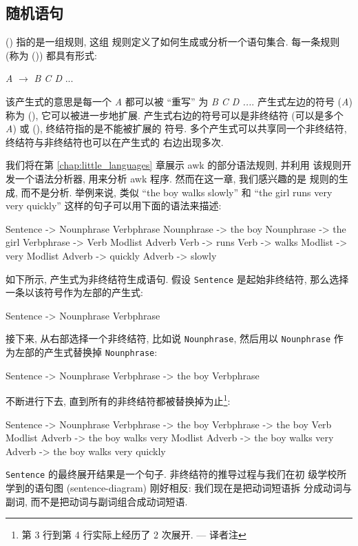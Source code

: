 \subsection{随机语句}
\label{subsec:random_sentences}

 () 指的是一组规则, 这组
规则定义了如何生成或分析一个语句集合. 每一条规则 (称为 
()) 都具有形式:
\begin{pattern}
    \indent\indent\textit{A} $\longrightarrow$ \textit{B C D} ...
\end{pattern}
该产生式的意思是每一个 \textit{A} 都可以被 ``重写'' 为 \textit{B C D ...}.
产生式左边的符号 (\textit{A}) 称为  (),
它可以被进一步地扩展. 产生式右边的符号可以是非终结符 (可以是多个
\textit{A}) 或  (), 终结符指的是不能被扩展的
符号. 多个产生式可以共享同一个非终结符, 终结符与非终结符也可以在产生式的
右边出现多次.

我们将在第 \ref{chap:little_languages} 章展示 awk 的部分语法规则, 并利用
该规则开发一个语法分析器, 用来分析 awk 程序. 然而在这一章, 我们感兴趣的是
规则的生成, 而不是分析. 举例来说, 类似 ``the boy walks slowly'' 和 ``the
girl runs very very quickly'' 这样的句子可以用下面的语法来描述:
\begin{awkcode}
    Sentence -> Nounphrase Verbphrase
    Nounphrase -> the boy
    Nounphrase -> the girl
    Verbphrase -> Verb Modlist Adverb
    Verb -> runs
    Verb -> walks
    Modlist -> very Modlist
    Adverb -> quickly
    Adverb -> slowly
\end{awkcode}

如下所示, 产生式为非终结符生成语句. 假设 \texttt{Sentence} 是起始非终结符,
那么选择一条以该符号作为左部的产生式:
\begin{awkcode}
    Sentence -> Nounphrase Verbphrase
\end{awkcode}
接下来, 从右部选择一个非终结符, 比如说 \texttt{Nounphrase}, 然后用以
\texttt{Nounphrase} 作为左部的产生式替换掉 \texttt{Nounphrase}:
\begin{awkcode}
    Sentence -> Nounphrase Verbphrase
             -> the boy Verbphrase
\end{awkcode}
不断进行下去, 直到所有的非终结符都被替换掉为止\footnote{第 3 行到第 4
行实际上经历了 2 次展开. --- 译者注}:
\begin{awkcode}
    Sentence -> Nounphrase Verbphrase
             -> the boy Verbphrase
             -> the boy Verb Modlist Adverb
             -> the boy walks very Modlist Adverb
             -> the boy walks very Adverb
             -> the boy walks very quickly
\end{awkcode}
\texttt{Sentence} 的最终展开结果是一个句子. 非终结符的推导过程与我们在初
级学校所学到的语句图 (sentence-diagram) 刚好相反: 我们现在是把动词短语拆
分成动词与副词, 而不是把动词与副词组合成动词短语.

